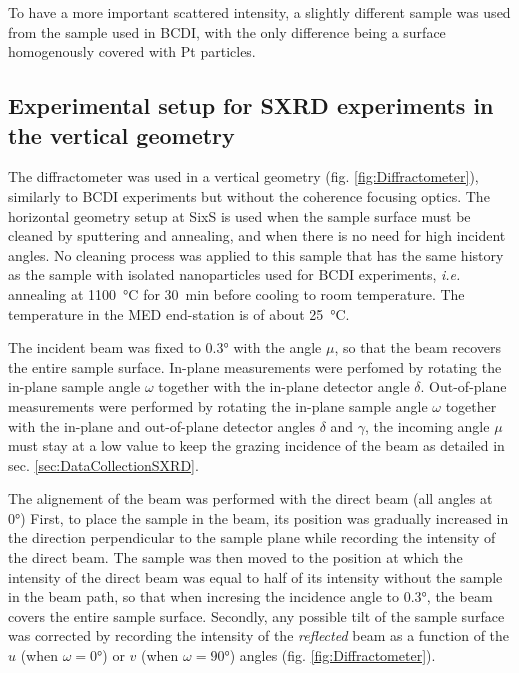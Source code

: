 To have a more important scattered intensity, a slightly different sample was used from the sample used in BCDI, with the only difference being a surface homogenously covered with Pt particles.

\subsection{Experimental setup for SXRD experiments in the vertical geometry}\label{sec:SXRDSetupV}

The diffractometer was used in a vertical geometry (fig. \ref{fig:Diffractometer}), similarly to BCDI experiments but without the coherence focusing optics.
The horizontal geometry setup at SixS is used when the sample surface must be cleaned by sputtering and annealing, and when there is no need for high incident angles.
No cleaning process was applied to this sample that has the same history as the sample with isolated nanoparticles used for BCDI experiments, \textit{i.e.} annealing at \qty{1100}{\degreeCelsius} for \qty{30}{\minute} before cooling to room temperature.
The temperature in the MED end-station is of about \qty{25}{\degreeCelsius}.

The incident beam was fixed to \ang{0.3} with the angle $\mu$, so that the beam recovers the entire sample surface.
In-plane measurements were perfomed by rotating the in-plane sample angle $\omega$ together with the in-plane detector angle $\delta$.
Out-of-plane measurements were performed by rotating the in-plane sample angle $\omega$ together with the in-plane and out-of-plane detector angles $\delta$ and $\gamma$, the incoming angle $\mu$ must stay at a low value to keep the grazing incidence of the beam as detailed in sec. \ref{sec:DataCollectionSXRD}.

The alignement of the beam was performed with the direct beam (all angles at \ang{0})
First, to place the sample in the beam, its position was gradually increased in the direction perpendicular to the sample plane while recording the intensity of the direct beam.
The sample was then moved to the position at which the intensity of the direct beam was equal to half of its intensity without the sample in the beam path, so that when incresing the incidence angle to \ang{0.3}, the beam covers the entire sample surface.
Secondly, any possible tilt of the sample surface was corrected by recording the intensity of the \textit{reflected} beam as a function of the $u$ (when $\omega=\ang{0}$) or $v$ (when $\omega=\ang{90}$) angles (fig. \ref{fig:Diffractometer}).

